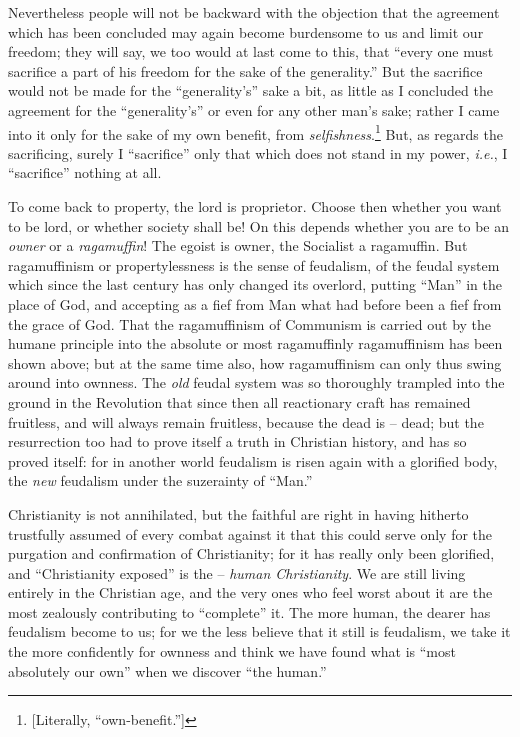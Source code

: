 Nevertheless people will not be backward with the objection that the agreement 
which has been concluded may again become burdensome to us and limit our 
freedom; they will say, we too would at last come to this, that ``every one 
must sacrifice a part of his freedom for the sake of the generality.'' But 
the sacrifice would not be made for the ``generality's'' sake a bit, as 
little as I concluded the agreement for the ``generality's'' or even for any 
other man's sake; rather I came into it only for the sake of my own benefit, 
from \textit{selfishness}.\footnote{[Literally, ``own-benefit.'']} But, as 
regards the sacrificing, surely I ``sacrifice'' only that which does not 
stand in my power, \textit{i.e.}, I ``sacrifice'' nothing at all.

To come back to property, the lord is proprietor. Choose then whether you want 
to be lord, or whether society shall be! On this depends whether you are to be 
an \textit{owner} or a \textit{ragamuffin}! The egoist is owner, the Socialist 
a ragamuffin. But ragamuffinism or propertylessness is the sense of feudalism, 
of the feudal system which since the last century has only changed its 
overlord, putting ``Man'' in the place of God, and accepting as a fief from 
Man what had before been a fief from the grace of God. That the ragamuffinism 
of Communism is carried out by the humane principle into the absolute or most 
ragamuffinly ragamuffinism has been shown above; but at the same time also, 
how ragamuffinism can only thus swing around into ownness. The \textit{old} 
feudal system was so thoroughly trampled into the ground in the Revolution 
that since then all reactionary craft has remained fruitless, and will always 
remain fruitless, because the dead is -- dead; but the resurrection too had to 
prove itself a truth in Christian history, and has so proved itself: for in 
another world feudalism is risen again with a glorified body, the \textit{new} 
feudalism under the suzerainty of ``Man.''

Christianity is not annihilated, but the faithful are right in having hitherto 
trustfully assumed of every combat against it that this could serve only for 
the purgation and confirmation of Christianity; for it has really only been 
glorified, and ``Christianity exposed'' is the -- \textit{human 
Christianity}. We are still living entirely in the Christian age, and the very 
ones who feel worst about it are the most zealously contributing to 
``complete'' it. The more human, the dearer has feudalism become to us; for 
we the less believe that it still is feudalism, we take it the more 
confidently for ownness and think we have found what is ``most absolutely our 
own'' when we discover ``the human.''

